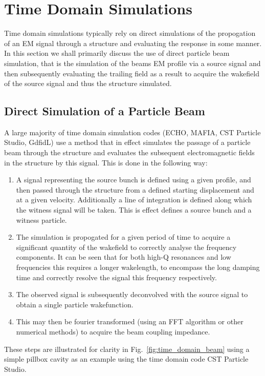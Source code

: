 \section{Time Domain Simulations}

Time domain simulations typically rely on direct simulations of the propogation of an EM signal through a structure and evaluating the response in some manner. In this section we shall primarily discuss the use of direct particle beam simulation, that is the simulation of the beams EM profile via a source signal and then subsequently evaluating the trailing field as a result to acquire the wakefield of the source signal and thus the structure simulated.

\subsection{Direct Simulation of a Particle Beam}

A large majority of time domain simulation codes (ECHO, MAFIA, CST Particle Studio, GdfidL) use a method that in effect simulates the passage of a particle beam through the structure and evaluates the subsequent electromagnetic fields in the structure by this signal. This is done in the following way:

\begin{enumerate}
\item{A signal representing the source bunch is defined using a given profile, and then passed through the structure from a defined starting displacement and at a given velocity. Additionally a line of integration is defined along which the witness signal will be taken. This is effect defines a source bunch and a witness particle.}
\item{The simulation is propogated for a given period of time to acquire a significant quantity of the wakefield to correctly analyse the frequency components. It can be seen that for both high-Q resonances and low frequencies this requires a longer wakelength, to encompass the long damping time and correctly resolve the signal this frequency respectively.}
\item{The observed signal is subsequently deconvolved with the source signal to obtain a single particle wakefunction.}
\item{This may then be fourier transformed (using an FFT algorithm or other numerical methods) to acquire the beam coupling impedance.}
\end{enumerate}

These steps are illustrated for clarity in Fig.~\ref{fig:time_domain_beam} using a simple pillbox cavity as an example using the time domain code CST Particle Studio.

